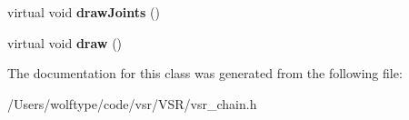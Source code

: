 \begin{DoxyCompactItemize}
\item 
\hypertarget{classvsr_1_1_chain_ae9ad3b33d54513e822b657f8258a0d85}{virtual void {\bfseries draw\-Joints} ()}\label{classvsr_1_1_chain_ae9ad3b33d54513e822b657f8258a0d85}

\item 
\hypertarget{classvsr_1_1_chain_ad383a7d8ab3fba12455dd2be84c268e8}{virtual void {\bfseries draw} ()}\label{classvsr_1_1_chain_ad383a7d8ab3fba12455dd2be84c268e8}

\end{DoxyCompactItemize}


The documentation for this class was generated from the following file\-:\begin{DoxyCompactItemize}
\item 
/\-Users/wolftype/code/vsr/\-V\-S\-R/vsr\-\_\-chain.\-h\end{DoxyCompactItemize}
